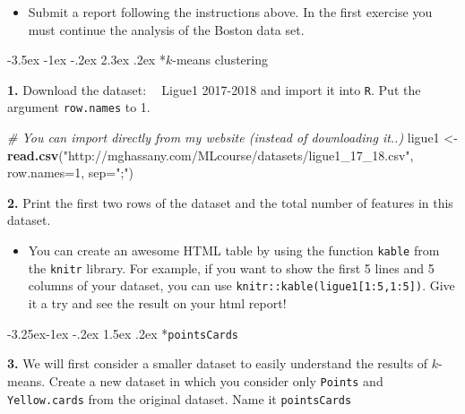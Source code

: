 \documentclass[]{book}
\makeatletter
\newenvironment{Shaded}{\begin{snugshade}}{\end{snugshade}}
\newcommand{\KeywordTok}[1]{\textcolor[rgb]{0.13,0.29,0.53}{\textbf{#1}}}
\newcommand{\DataTypeTok}[1]{\textcolor[rgb]{0.13,0.29,0.53}{#1}}
\newcommand{\DecValTok}[1]{\textcolor[rgb]{0.00,0.00,0.81}{#1}}
\newcommand{\StringTok}[1]{\textcolor[rgb]{0.31,0.60,0.02}{#1}}
\newcommand{\CommentTok}[1]{\textcolor[rgb]{0.56,0.35,0.01}{\textit{#1}}}
\newcommand{\NormalTok}[1]{#1}
\newenvironment{rmdblock}[1]
  {\begin{shaded*}
  \begin{itemize}
  \renewcommand{\labelitemi}{
    \raisebox{-.7\height}[0pt][0pt]{
      {\setkeys{Gin}{width=2em,keepaspectratio}\texttt{[image: img/icons/\#1]}}
    }
  }
  \item
  }
  {
  \end{itemize}
  \end{shaded*}
  }
\newenvironment{rmdexercise}
  {\begin{rmdblock}{exercise}}
  {\end{rmdblock}}
\newenvironment{rmdtip}
  {\begin{rmdblock}{tip}}
  {\end{rmdblock}}
\renewcommand\section{\@startsection {section}{1}{\z@}%
                                   {-3.5ex \@plus -1ex \@minus -.2ex}%
                                   {2.3ex \@plus.2ex}%
                                   {\normalfont\Large\bfseries\color{ForestGreen}}}
\renewcommand\subsection{\@startsection{subsection}{2}{\z@}%
                                     {-3.25ex\@plus -1ex \@minus -.2ex}%
                                     {1.5ex \@plus .2ex}%
                                     {\normalfont\large\bfseries\color{Violet}}}
\theoremstyle{definition}
\theoremstyle{definition}
\theoremstyle{definition}
\theoremstyle{remark}
\makeatother
\begin{document}
\begin{rmdexercise}
Submit a report following the instructions above. In the first exercise
you must continue the analysis of the Boston data set.
\end{rmdexercise}

\section*{\texorpdfstring{\(k\)-means
clustering}{k-means clustering}}\label{k-means-clustering}

\textbf{1.} Download the dataset:
\textcolor{white}{[}\faTable\textcolor{white}{]} Ligue1 2017-2018 and
import it into \texttt{R}. Put the argument \texttt{row.names} to 1.

\begin{Shaded}
\begin{Highlighting}[]
\CommentTok{# You can import directly from my website (instead of downloading it..)}
\NormalTok{ligue1 <-}\StringTok{ }\KeywordTok{read.csv}\NormalTok{(}\StringTok{"http://mghassany.com/MLcourse/datasets/ligue1_17_18.csv"}\NormalTok{, }\DataTypeTok{row.names=}\DecValTok{1}\NormalTok{, }\DataTypeTok{sep=}\StringTok{";"}\NormalTok{)}
\end{Highlighting}
\end{Shaded}

\textbf{2.} Print the first two rows of the dataset and the total number
of features in this dataset.

\begin{rmdtip}
You can create an awesome HTML table by using the function
\texttt{kable} from the \texttt{knitr} library. For example, if you want
to show the first 5 lines and 5 columns of your dataset, you can use
\texttt{knitr::kable(ligue1{[}1:5,1:5{]})}. Give it a try and see the
result on your html report!
\end{rmdtip}

\subsection*{\texorpdfstring{\texttt{pointsCards}}{pointsCards}}\label{pointscards}

\textbf{3.} We will first consider a smaller dataset to easily
understand the results of \(k\)-means. Create a new dataset in which you
consider only \texttt{Points} and \texttt{Yellow.cards} from the
original dataset. Name it \texttt{pointsCards}
\end{document}
